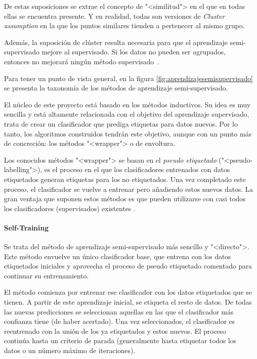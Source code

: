 De estas suposiciones se extrae el concepto de "<similitud"> en el que en todas
ellas se encuentra presente. Y en realidad, todas son versiones de
\textit{Cluster assumption} en la que los puntos similares tienden a pertenecer
al mismo grupo. 

Además, la suposición de clúster resulta necesaria para que el aprendizaje
semi-supervisado mejore al supervisado. Si los datos no pueden ser agrupados,
entonces no mejorará ningún método supervisado~\cite{vanEngelen2020}.


Para tener un punto de vista general, en la figura \ref{fig:aprendizajesemisupervisado} se presenta la
taxonomía de los métodos de aprendizaje semi-supervisado.


El núcleo de este proyecto está basado en los métodos inductivos. Su idea es muy
sencilla y está altamente relacionada con el objetivo del aprendizaje
supervisado, trata de crear un clasificador que prediga etiquetas para datos
nuevos. Por lo tanto, los algoritmos construidos tendrán este objetivo, aunque
con un punto más de concreción: los métodos "<wrapper"> o de envoltura.

Los conocidos métodos "<wrapper"> se basan en el \textit{pseudo etiquetado}
("<pseudo-labelling">), es el proceso en el que los clasificadores entrenados
con datos etiquetados generan etiquetas para los no etiquetados. Una vez
completado este proceso, el clasificador se vuelve a entrenar pero añadiendo
estos nuevos datos. La gran ventaja que suponen estos métodos es que pueden
utilizarse con casi todos los clasificadores (supervisados) existentes
\cite{vanEngelen2020}.

\paragraph{Self-Training}
Se trata del método de aprendizaje semi-supervisado más sencillo y "<directo">.
Este método envuelve un único clasificador base, que entrena con los datos
etiquetados iniciales y aprovecha el proceso de pseudo etiquetado comentado para
continuar su entrenamiento.

El método comienza por entrenar ese clasificador con los datos etiquetados que
se tienen. A partir de este aprendizaje inicial, se etiqueta el resto de datos.
De todas las nuevas predicciones se seleccionan aquellas en las que el
clasificador más confianza tiene (de haber acertado). Una vez seleccionados, el
clasificador es reentrenado con la unión de los ya etiquetados y estos nuevos.
El proceso continúa hasta un criterio de parada (generalmente hasta etiquetar
todos los datos o un número máximo de iteraciones).

